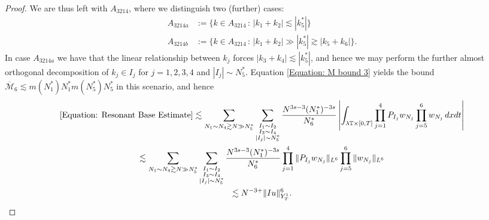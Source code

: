 \documentclass[12pt, letterpaper]{amsart}
\begin{document}
\begin{proof}
    We are thus left with $A_{3214}$, where we distinguish two (further) cases:
    \begin{align*}
        A_{3214a} &:= \{k\in A_{3214}\,:\,|k_1+k_2|\lesssim |k_5^*|\}\\
        A_{3214b} &:= \{k\in A_{3214}\,:\,|k_1+k_2|\gg |k_5^*|\gtrsim |k_5+k_6|\}.
    \end{align*}
    In case $A_{3214a}$ we have that the linear relationship between $k_j$ forces $|k_3+k_4|\lesssim |k_5^*|$, and hence we may perform the further almost orthogonal decomposition of $k_j\in I_j$ for $j=1,2,3,4$ and $|I_j|\sim N_5^*$. Equation \eqref{Equation: M bound 3} yields the bound $\overline{\mathcal{M}}_6\lesssim m(N_1^*)N_1^*m(N_5^*)N_5^*$ in this scenario, and hence
    \begin{multline*}
        \eqref{Equation: Resonant Base Estimate}\lesssim \sum_{N_1\sim N_4\gtrsim N\gg N_5^*}\sum_{\substack{I_1\sim I_2\\ I_3\sim I_4\\|I_j|\sim N_5^*}}\frac{N^{3s-3}(N_1^*)^{-3s}}{N_6^*}\left|\int_{\lambda\mathbb{T}\times [0,T]}\prod_{j=1}^4P_{I_j}w_{N_j}\prod_{j=5}^6w_{N_j}\,dxdt\right|\\
        \lesssim \sum_{N_1\sim N_4\gtrsim N\gg N_5^*}\sum_{\substack{I_1\sim I_2\\ I_3\sim I_4\\|I_j|\sim N_5^*}}\frac{N^{3s-3}(N_1^*)^{-3s}}{N_6^*}\prod_{j=1}^4\|P_{I_j}w_{N_j}\|_{L^6}\prod_{j=5}^6\|w_{N_j}\|_{L^6}\\
        \lesssim N^{-3+}\|Iu\|_{Y^1_T}^6.
    \end{multline*}


\end{proof}
\end{document}
